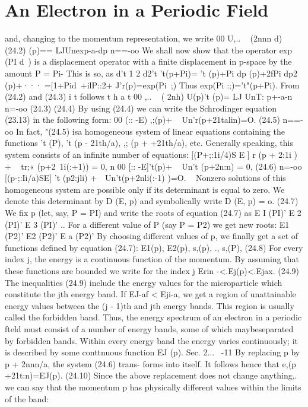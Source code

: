 \documentclass[a4paper,sfsidenotes,colorlinks=true]{tufte-book}
\numberwithin{equation}{section}
\numberwithin{figure}{section}
\begin{document}
{{{{{\section{An Electron in a Periodic Field}
and, changing to the momentum representation, we write 00
U,..	~	(2nnn d)	(24.2) (p)== LJUnexp-a-dp 
n==-oo We shall now show that the operator exp (PI d~) is
a displacement operator with a finite displacement in p-space by the amount P = Pi- This is so, as
d't	1 2 d2't 't(p+Pi)= 't (p)+Pi dp (p)+2fPi dp2 (p)+···
=[1+Pid~+ilP::2+ J'r(p)=exp(Pi~;) Thus
exp(Pi :;)='t"(p+Pi).
From	(24.2)	and	(24.3)	i t	follows	t h a t 00
,..	~ ( 2nh) U(p)'t (p)= LJ UnT: p+-a-n 
n=-oo
(24.3)
(24.4)
By using (24.4) we can write the Schrodinger equation (23.13) in the following form:
00
(:: -E) ,;(p)+	~	Un'r(p+21talin)=O.	(24.5) n==-oo
In fact, "(24.5) isa homogeneous system of linear equations containing the functions 't (P), 't (p - 21th/a), ,; (p + +21th/a), etc. Generally speaking, this system consists of an infinite number of equations:
 [(P+;:1i/4)S E ] r	(p + 2:1i )
+ ~ tr;« (p+2~1i(:+1)) = 0, n
00
[:: -E]'t(p)+	~ Un't (p+2n:n) = 0, 	(24.6) n=-oo
[(p-;:Ii/a)SE] 't (p2:jli) +~~Un't(p+2nli(:-1) )=O.
~
Nonzero solutions of this homogeneous system are possible only if its determinant is equal to zero. We denote this determinant by D (E, p) and symbolically write
D (E, p) = o.	(24.7)
We fix p (let, say, P = PI) and write the roots of equation (24.7)	as	E I	(PI)'	E 2	(PI)'	E 3	(PI)'	..	For	a	different value of P (say P = P2) we get new roots: E1 (P2)' E2 (P2)' E a (P2)'	By	choosing	different	values	of	p,	we finally get a set of functions defined by equation (24.7):
E1(p), E2(p), s,(p),	., s,(P),	(24.8)
For every index j, the energy is a continuous function of the momentum. By assuming that these functions are bounded we write for the index j
Erin -<.Ej(p)<.Ejax.	(24.9) The inequalities (24.9) include the energy values for the
microparticle which constitute the jth energy band. If EJ-af < Eji-a, we get a region of unattainable energy values betweea the (j - 1)th and jth energy bands. This region is usually called the forbidden band.
Thus, the energy spectrum of an electron in a periodic fteld must consist of a number of energy bands, some of which maybeseparated by forbidden bands. Within every energy band the energy varies continuously; it is described
by some conttnuous function EJ (p). Sec. 2...
~-11
By replacing p by p + 2nnn/a, the system (24.6) trans- forms into itself. It follows hence that
e,(p +21t:n)=EJ(p).	(24.10)
Since the above replacement does not change anything,. we can say that the momentum p has physically different values within the limits of the band:
}}}}}
\end{document}
